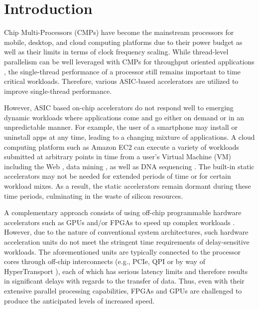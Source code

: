
\section{Introduction}


Chip Multi-Processors (CMPs) have become the mainstream processors for
mobile, desktop, and cloud computing platforms due to their power
budget as well as their limits in terms of clock frequency scaling. While
thread-level parallelism can be well leveraged with CMPs
for throughput oriented applications \cite{CMP05}, the single-thread performance of
a processor still remains important to time critical workloads. Therefore,
various ASIC-based accelerators are utilized to improve single-thread performance. 

However, ASIC based on-chip accelerators do not respond well to
emerging dynamic workloads where applications come and go either on
demand or in an unpredictable manner. For example, the user of a smartphone may
install or uninstall apps at any time, leading to a changing mixture
of applications. A cloud computing platform such as Amazon EC2
\cite{amazon-ec2} can execute a variety of workloads submitted at arbitrary points in time from a user's Virtual Machine (VM) 
 including the Web \cite{Chen:2012jo}, data mining \cite{ec2-datamining}, as well as DNA sequencing
\cite{ec2-dna}.  The built-in static accelerators may not be needed for extended periods of time
or for certain workload mixes.  As a result, the static accelerators remain dormant during these time periods, 
culminating in the waste of silicon resources.

A complementary approach consists of using off-chip programmable hardware
accelerators such as GPUs and/or FPGAs to speed up complex workloads
\cite{GPUFPGA, fpga-acc}. However, due to the nature of conventional system architectures, 
such hardware acceleration units do not meet the stringent time requirements 
of delay-sensitive workloads. The aforementioned units are typically
connected to the processor cores through off-chip interconnects
(e.g., PCIe, QPI \cite{intel-qpi} or by way of HyperTransport
\cite{amd-hypertransport}), each of which has serious latency limits and therefore results in
significant delays with regards to the transfer of data. Thus, even with their extensive
parallel processing capabilities, FPGAs and GPUs are challenged to produce the anticipated levels
of increased speed.  

